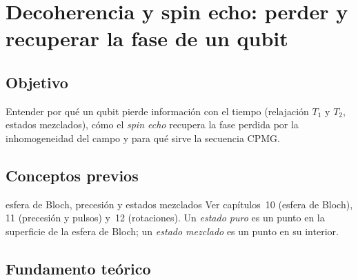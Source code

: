\def\tituloconcepto{Decoherencia y spin echo}


\section{Decoherencia y spin echo: perder y recuperar la fase de un qubit}

\subsection{Objetivo}
Entender por qué un qubit pierde información con el tiempo (relajación $T_1$ y
$T_2$, estados mezclados), cómo el \emph{spin echo} recupera la fase perdida por
la inhomogeneidad del campo y para qué sirve la secuencia CPMG.

\subsection{Conceptos previos}
\begin{concepto}{esfera de Bloch, precesión y estados mezclados}
Ver capítulos~10 (esfera de Bloch), 11 (precesión y pulsos) y~12 (rotaciones).
Un \emph{estado puro} es un punto en la superficie de la esfera de Bloch; un
\emph{estado mezclado} es un punto en su interior.
\end{concepto}

\subsection{Fundamento teórico}
